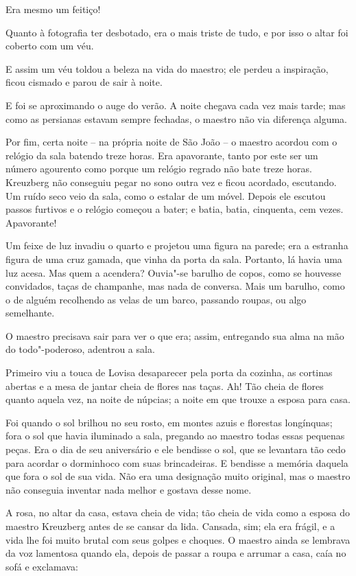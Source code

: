 Era mesmo um feitiço!

Quanto à fotografia ter desbotado, era o mais triste de tudo, e por isso
o altar foi coberto com um véu. 

E assim um véu toldou a beleza na vida do maestro; ele perdeu a
inspiração, ficou cismado e parou de sair à noite.

E foi se aproximando o auge do verão. A noite chegava cada vez mais
tarde; mas como as persianas estavam sempre fechadas, o maestro não
via diferença alguma. 

Por fim, certa noite -- na própria noite de São João -- o maestro acordou
com o relógio da sala batendo treze horas. Era apavorante, tanto por
este ser um número agourento como porque um relógio regrado não bate
treze horas. Kreuzberg não conseguiu pegar no sono outra vez e ficou
acordado, escutando. Um ruído seco veio da sala, como o estalar de um
móvel. Depois ele escutou passos furtivos e o relógio começou a bater;
e batia, batia, cinquenta, cem vezes. Apavorante!

Um feixe de luz invadiu o quarto e projetou uma figura na parede; era a
estranha figura de uma cruz gamada, que vinha da porta da sala.
Portanto, lá havia uma luz acesa. Mas quem a acendera? Ouvia"-se 
barulho de copos, como se houvesse convidados, taças de champanhe, mas
nada de conversa. Mais um barulho, como o de alguém recolhendo as velas
de um barco, passando roupas, ou algo semelhante.

O maestro precisava sair para ver o que era; assim, entregando sua alma
na mão do todo"-poderoso, adentrou a sala.

Primeiro viu a touca de Lovisa desaparecer pela porta da cozinha, as
cortinas abertas e a mesa de jantar cheia de flores nas taças. Ah! Tão
cheia de flores quanto aquela vez, na noite de núpcias; a noite em que
trouxe a esposa para casa.

Foi quando o sol brilhou no seu rosto, em montes azuis e florestas
longínquas; fora o sol que havia iluminado a sala, pregando ao maestro
todas essas pequenas peças. Era o dia de seu aniversário e ele bendisse
o sol, que se levantara tão cedo para acordar o dorminhoco com suas
brincadeiras. E bendisse a memória daquela que fora o sol de sua
vida. Não era uma designação muito original, mas o maestro não
conseguia inventar nada melhor e gostava desse nome.

A rosa, no altar da casa, estava cheia de vida; tão cheia de vida como a
esposa do maestro Kreuzberg antes de se cansar da lida. Cansada, sim;
ela era frágil, e a vida lhe foi muito brutal com seus golpes e
choques. O maestro ainda se lembrava da voz lamentosa quando ela,
depois de passar a roupa e arrumar a casa, caía no sofá e exclamava:

